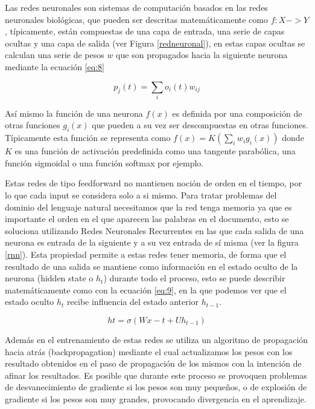 Las redes neuronales son sistemas de computación basados en las redes neuronales biológicas, que pueden ser descritas matemáticamente como \(f: X -> Y\), típicamente, están compuestas de una capa de entrada, una serie de capas ocultas y una capa de salida (ver Figura \ref{redneuronal}), en estas capas ocultas se calculan una serie de pesos \(w\) que son propagados hacia la siguiente neurona mediante la ecuación \ref{eq:8}

\begin{equation} \label{eq:8}
\mathit{p_j(t) = \sum_io_i(t)w_{ij}}
\end{equation}

Así mismo la función de una neurona \(f(x)\) es definida por una composición de otras funciones \(g_i(x)\) que pueden a su vez ser descompuestas en otras funciones. Típicamente esta función se representa como \(f(x) = K(\sum_iw_ig_i(x))\) donde \(K\) es una función de activación predefinida como una tangente parabólica, una función sigmoidal o una función softmax por ejemplo. 

Estas redes de tipo feedforward no mantienen noción de orden en el tiempo, por lo que cada input se considera solo a si mismo. Para tratar problemas del dominio del lenguaje natural necesitamos que la red tenga memoria ya que es importante el orden en el que aparecen las palabras en el documento, esto se soluciona utilizando Redes Neuronales Recurrentes en las que cada salida de una neurona es entrada de la siguiente y a su vez entrada de sí misma (ver la figura \ref{rnn}). Esta propiedad permite a estas redes tener memoria, de forma que el resultado de una salida se mantiene como información en el estado oculto de la neurona (hidden state o \(h_t\)) durante todo el proceso, esto se puede describir matemáticamente como con la ecuación \ref{eq:9}, en la que podemos ver que el estado oculto \(h_t\) recibe influencia del estado anterior \(h_{t - 1}\).

\begin{equation} \label{eq:9}
ht = \sigma(Wx-t + Uh_{t-1})
\end{equation}

Además en el entrenamiento de estas redes se utiliza un algoritmo de propagación hacia atrás (backpropagation) mediante el cual actualizamos los pesos con los resultado obtenidos en el paso de propagación de los mismos con la intención de afinar los resultados. Es posible que durante este proceso se provoquen problemas de desvanecimiento de gradiente si los pesos son muy pequeños, o de explosión de gradiente si los pesos son muy grandes, provocando divergencia en el aprendizaje.

